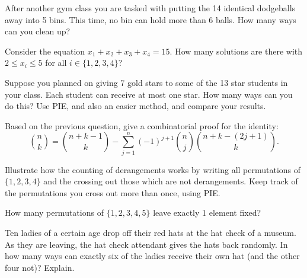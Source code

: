\documentclass[10pt,]{book}
\theoremstyle{plain}
\theoremstyle{definition}
\theoremstyle{definition}
\theoremstyle{definition}
\theoremstyle{definition}
\numberwithin{equation}{chapter}
\begin{document}
\begin{divisionexercise}{3}\hypertarget{exercise-72}{}
\hypertarget{p-1035}{}%
After another gym class you are tasked with putting the 14 identical dodgeballs away into 5 bins. This time, no bin can hold more than 6 balls. How many ways can you clean up?%
\end{divisionexercise}%
\begin{divisionexercise}{4}\hypertarget{exercise-73}{}
\hypertarget{p-1037}{}%
Consider the equation \(x_1 + x_2 + x_3 + x_4 = 15\). How many solutions are there with \(2 \le x_i \le 5\) for all \(i \in \{1,2,3,4\}\)?%
\end{divisionexercise}%
\begin{divisionexercise}{5}\hypertarget{exercise-74}{}
\hypertarget{p-1041}{}%
Suppose you planned on giving 7 gold stars to some of the 13 star students in your class. Each student can receive at most one star. How many ways can you do this? Use PIE, and also an easier method, and compare your results.%
\end{divisionexercise}%
\begin{divisionexercise}{6}\hypertarget{exercise-75}{}
\hypertarget{p-1042}{}%
Based on the previous question, give a combinatorial proof for the identity:%
\begin{equation*}
{n \choose k} = {n+k-1 \choose k} - \sum_{j=1}^n (-1)^{j+1}{n \choose j}{n+k-(2j+1) \choose k}.
\end{equation*}
%
\end{divisionexercise}%
\begin{divisionexercise}{7}\hypertarget{exercise-76}{}
\hypertarget{p-1043}{}%
Illustrate how the counting of derangements works by writing all permutations of \(\{1,2,3,4\}\) and the crossing out those which are not derangements. Keep track of the permutations you cross out more than once, using PIE.%
\end{divisionexercise}%
\begin{divisionexercise}{8}\hypertarget{exercise-77}{}
\hypertarget{p-1045}{}%
How many permutations of \(\{1,2,3,4,5\}\) leave exactly 1 element fixed?%
\end{divisionexercise}%
\begin{divisionexercise}{9}\hypertarget{exercise-78}{}
\hypertarget{p-1047}{}%
Ten ladies of a certain age drop off their red hats at the hat check of a museum. As they are leaving, the hat check attendant gives the hats back randomly. In how many ways can exactly six of the ladies receive their own hat (and the other four not)?  Explain.%
\end{divisionexercise}%
\end{document}
